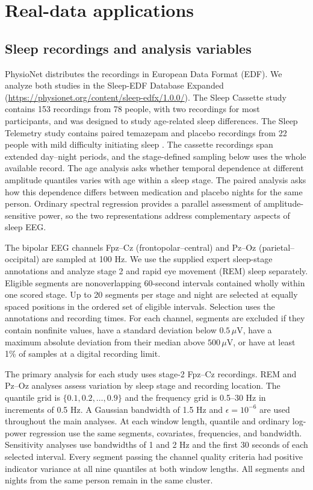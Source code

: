\section{Real-data applications}\label{sec:realdata}
\subsection{Sleep recordings and analysis variables}
PhysioNet distributes the recordings in European Data Format (EDF). We analyze both studies in the Sleep-EDF Database Expanded (\url{https://physionet.org/content/sleep-edfx/1.0.0/}). The Sleep Cassette study contains 153 recordings from 78 people, with two recordings for most participants, and was designed to study age-related sleep differences. The Sleep Telemetry study contains paired temazepam and placebo recordings from 22 people with mild difficulty initiating sleep \citep{Mourtazaev1995,Kemp2000}. The cassette recordings span extended day--night periods, and the stage-defined sampling below uses the whole available record. The age analysis asks whether temporal dependence at different amplitude quantiles varies with age within a sleep stage. The paired analysis asks how this dependence differs between medication and placebo nights for the same person. Ordinary spectral regression provides a parallel assessment of amplitude-sensitive power, so the two representations address complementary aspects of sleep EEG.

The bipolar EEG channels Fpz--Cz (frontopolar--central) and Pz--Oz (parietal--occipital) are sampled at 100 Hz. We use the supplied expert sleep-stage annotations and analyze stage 2 and rapid eye movement (REM) sleep separately. Eligible segments are nonoverlapping 60-second intervals contained wholly within one scored stage. Up to 20 segments per stage and night are selected at equally spaced positions in the ordered set of eligible intervals. Selection uses the annotations and recording times. For each channel, segments are excluded if they contain nonfinite values, have a standard deviation below $0.5\,\mu\mathrm V$, have a maximum absolute deviation from their median above $500\,\mu\mathrm V$, or have at least 1\% of samples at a digital recording limit.

The primary analysis for each study uses stage-2 Fpz--Cz recordings. REM and Pz--Oz analyses assess variation by sleep stage and recording location. The quantile grid is $\{0.1,0.2,\ldots,0.9\}$ and the frequency grid is 0.5--30 Hz in increments of 0.5 Hz. A Gaussian bandwidth of 1.5 Hz and $\epsilon=10^{-6}$ are used throughout the main analyses. At each window length, quantile and ordinary log-power regression use the same segments, covariates, frequencies, and bandwidth. Sensitivity analyses use bandwidths of 1 and 2 Hz and the first 30 seconds of each selected interval. Every segment passing the channel quality criteria had positive indicator variance at all nine quantiles at both window lengths. All segments and nights from the same person remain in the same cluster.

